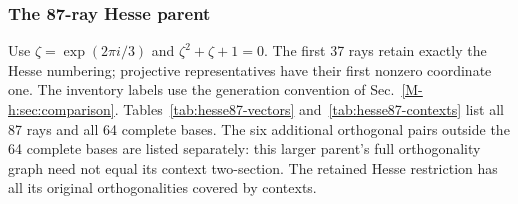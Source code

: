 \documentclass[aps,pra,reprint,superscriptaddress,longbibliography,nofootinbib,floatfix,10pt]{revtex4-2}
\theoremstyle{definition}
\begin{document}
\subsubsection{The 87-ray Hesse parent}
Use $\zeta=\exp(2\pi i/3)$ and $\zeta^2+\zeta+1=0$.
The first 37 rays retain exactly the Hesse numbering; projective
representatives have their first nonzero coordinate one. The inventory
labels use the generation convention of Sec.~\ref{M-h:sec:comparison}.
Tables~\ref{tab:hesse87-vectors} and~\ref{tab:hesse87-contexts} list all
87 rays and all 64 complete bases.
The six additional orthogonal pairs outside the 64 complete bases are
listed separately: this larger parent's full orthogonality graph need
not equal its context two-section. The retained Hesse restriction has
all its original orthogonalities covered by contexts.
\begingroup\small
{}
\end{document}
